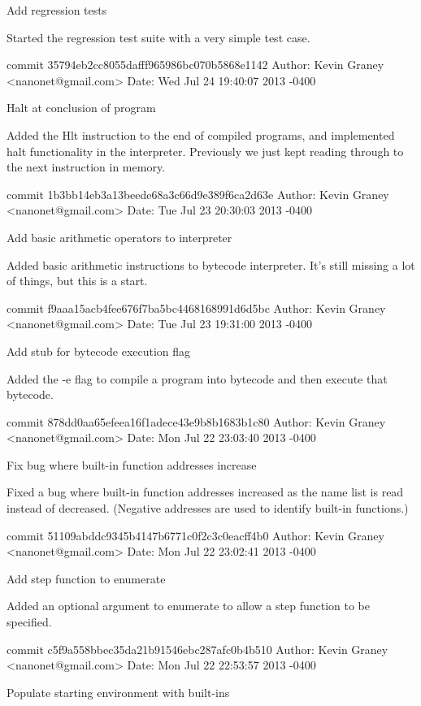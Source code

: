    Add regression tests
    
    Started the regression test suite with a very simple test case.

commit 35794eb2cc8055dafff965986bc070b5868e1142
Author: Kevin Graney <nanonet@gmail.com>
Date:   Wed Jul 24 19:40:07 2013 -0400

    Halt at conclusion of program
    
    Added the Hlt instruction to the end of compiled programs, and
    implemented halt functionality in the interpreter.  Previously
    we just kept reading through to the next instruction in memory.

commit 1b3bb14eb3a13beede68a3c66d9e389f6ca2d63e
Author: Kevin Graney <nanonet@gmail.com>
Date:   Tue Jul 23 20:30:03 2013 -0400

    Add basic arithmetic operators to interpreter
    
    Added basic arithmetic instructions to bytecode interpreter.  It's
    still missing a lot of things, but this is a start.

commit f9aaa15acb4fee676f7ba5bc4468168991d6d5bc
Author: Kevin Graney <nanonet@gmail.com>
Date:   Tue Jul 23 19:31:00 2013 -0400

    Add stub for bytecode execution flag
    
    Added the -e flag to compile a program into bytecode and then
    execute that bytecode.

commit 878dd0aa65efeea16f1adece43e9b8b1683b1c80
Author: Kevin Graney <nanonet@gmail.com>
Date:   Mon Jul 22 23:03:40 2013 -0400

    Fix bug where built-in function addresses increase
    
    Fixed a bug where built-in function addresses increased as the
    name list is read instead of decreased.  (Negative addresses are
    used to identify built-in functions.)

commit 51109abddc9345b4147b6771c0f2c3c0eacff4b0
Author: Kevin Graney <nanonet@gmail.com>
Date:   Mon Jul 22 23:02:41 2013 -0400

    Add step function to enumerate
    
    Added an optional argument to enumerate to allow a step function
    to be specified.

commit c5f9a558bbec35da21b91546ebc287afc0b4b510
Author: Kevin Graney <nanonet@gmail.com>
Date:   Mon Jul 22 22:53:57 2013 -0400

    Populate starting environment with built-ins
    
